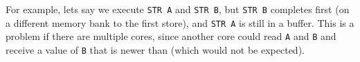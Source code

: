 For example, lets say we execute \texttt{STR A} and \texttt{STR B},
but \texttt{STR B} completes first (on a different memory bank to the
first store), and \texttt{STR A} is still in a buffer. This is a
problem if there are multiple cores, since another core could
read \texttt{A} and \texttt{B} and receive a value of \texttt{B} that
is newer than  (which would not be expected).




{}

